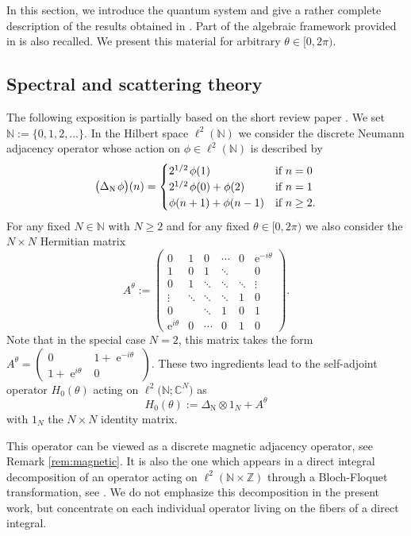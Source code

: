 \documentclass[11pt]{article}
\def\C{\mathbb C}
\def\N{\mathbb N}
\def\NN{\mathrm N}
\def\Z{\mathbb Z}
\def\e{\mathop{\mathrm{e}}\nolimits}
\begin{document}
In this section, we introduce the quantum system and give a rather complete description of the results obtained in \cite{NRT}. Part of the algebraic framework provided in \cite{APRR}
is also recalled. We present this material for arbitrary $\theta\in [0,2\pi)$.

\subsection{Spectral and scattering theory}\label{sec_ini}

The following exposition is partially based on the short review paper \cite{RiRIMS}.
We set $\N:=\{0,1,2,\dots\}$. In the Hilbert space $\ell^2(\N)$
we consider  the discrete Neumann
adjacency operator whose action on $\phi\in\ell^2(\N)$ is described by
$$
\big(\Delta_\NN\;\!\phi\big)(n)=
\begin{cases}
2^{1/2}\;\!\phi(1) &\hbox{if $n=0$}\\
2^{1/2}\;\!\phi(0)+\phi(2) &\hbox{if $n=1$}\\
\phi(n+1)+\phi(n-1) &\hbox{if $n\ge2$.}
\end{cases}
$$
For any fixed $N\in \N$ with $N\geq 2$ and for any fixed $\theta \in [0,2\pi)$ 
we also consider the $N\times N$ Hermitian matrix
\begin{equation*}
A^\theta:=
\begin{pmatrix}
0 & 1 & 0 &\cdots & 0 &\e^{-i\theta}\\
1 & 0 & 1 &\ddots &  & 0\\
0 & 1 &\ddots &\ddots &\ddots &\vdots\\
\vdots &\ddots &\ddots &\ddots & 1 & 0\\
0 & &\ddots & 1 & 0 & 1\\
\e^{i\theta} & 0 &\cdots & 0 & 1 & 0
\end{pmatrix}.
\end{equation*}
Note that in the special case $N=2$, this matrix takes the form 
$
A^\theta
=\left(\begin{smallmatrix}
0 & 1+\e^{-i\theta}\\
1+\e^{i\theta} & 0
\end{smallmatrix}\right).
$
These two ingredients lead to the self-adjoint operator $H_0(\theta)$ 
acting on $\ell^2\big(\N;\C^N\big)$ as
$$
H_0(\theta):=\Delta_\NN \otimes 1_N+ A^\theta
$$
with $1_N$ the $N \times N $ identity matrix.

This operator can be viewed as a discrete magnetic adjacency operator, see Remark \ref{rem:magnetic}. It is also the one which appears in a direct integral decomposition of 
an operator acting on $\ell^2(\N\times \Z)$ through a Bloch-Floquet
transformation, see \cite[Sec.~2]{NRT}. We do not emphasize this decomposition 
in the present work, but concentrate on each individual operator living on the fibers
of a direct integral.
\end{document}
